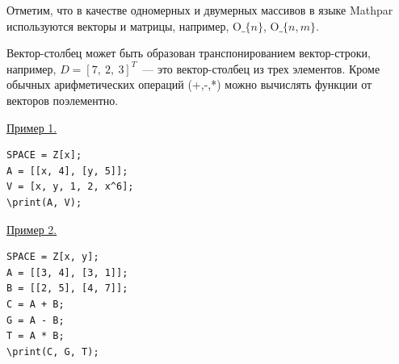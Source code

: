 Отметим, что в качестве одномерных и двумерных массивов в языке Mathpar используются векторы и матрицы, например,  O$\_\{n\}$, O$\_\{n,m\}$.

Вектор-столбец может быть образован транспонированием вектор-строки,  например,  $D=[7,\ 2,\ 3]^T$~--- это вектор-столбец из трех элементов. 
 Кроме обычных арифметических операций (+,-,*) можно вычислять функции от векторов поэлементно.

\smallskip

\underline{Пример 1. }
\begin{verbatim}
SPACE = Z[x];
A = [[x, 4], [y, 5]];
V = [x, y, 1, 2, x^6];
\print(A, V);
\end{verbatim}


\underline{Пример 2. }
\begin{verbatim}
SPACE = Z[x, y];
A = [[3, 4], [3, 1]];
B = [[2, 5], [4, 7]];
C = A + B;
G = A - B;
T = A * B;
\print(C, G, T);
\end{verbatim}

